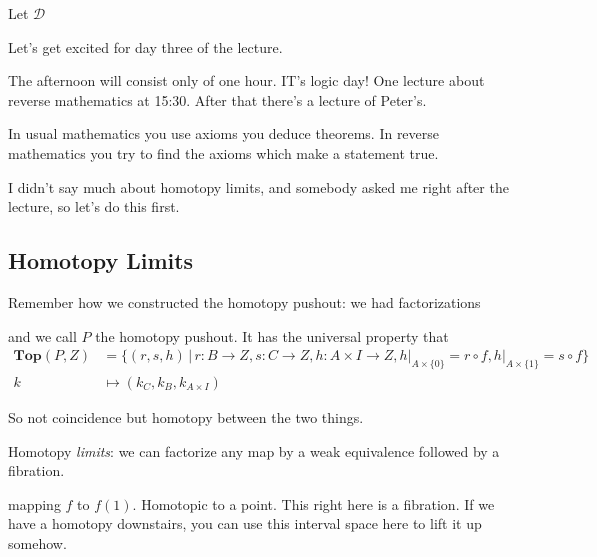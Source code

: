 \documentclass[../MH_Total.tex]{subfiles}
\newcommand{\Dd}{\mathcal{D}}
\begin{document}
Let $\Dd$

Let's get excited for day three of the lecture.

The afternoon will consist only of one hour. IT's logic day! One lecture about reverse mathematics at 15:30. After that there's a lecture of Peter's. 

In usual mathematics you use axioms you deduce theorems. In reverse mathematics you try to find the axioms which make a statement true.

I didn't say much about homotopy limits, and somebody asked me right after the lecture, so let's do this first.

\subsection{Homotopy Limits}
Remember how we constructed the homotopy pushout: we had factorizations
\begin{center}
\end{center}
and we call $P$ the homotopy pushout. It has the universal property that
\begin{align*}
\mathbf{Top}(P,Z) &= \{(r,s,h) \,|\, r: B \to Z, s: C \to Z, h: A \times I \to Z, h|_{A \times \{0\}} = r \circ f, h|_{A \times \{1\}} = s \circ f\}\\
	k &\mapsto (k_C,k_B,k_{A \times I})
\end{align*}

So not coincidence but homotopy between the two things. 

Homotopy \emph{limits}: we can factorize any map by a weak equivalence followed by a fibration. 

\begin{center}
\end{center}
mapping $f$ to $f(1)$. Homotopic to a point. This right here is a fibration. If we have a homotopy downstairs, you can use this interval space here to lift it up somehow.
\end{document}
